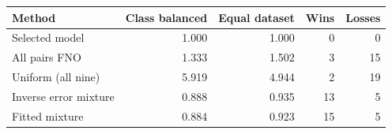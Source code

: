 \begin{tabular}{lrrrr}
\toprule
Method & Class balanced & Equal dataset & Wins & Losses \\
\midrule
Selected model & 1.000 & 1.000 & 0 & 0 \\
All pairs FNO & 1.333 & 1.502 & 3 & 15 \\
Uniform (all nine) & 5.919 & 4.944 & 2 & 19 \\
Inverse error mixture & 0.888 & 0.935 & 13 & 5 \\
Fitted mixture & 0.884 & 0.923 & 15 & 5 \\
\bottomrule
\end{tabular}
